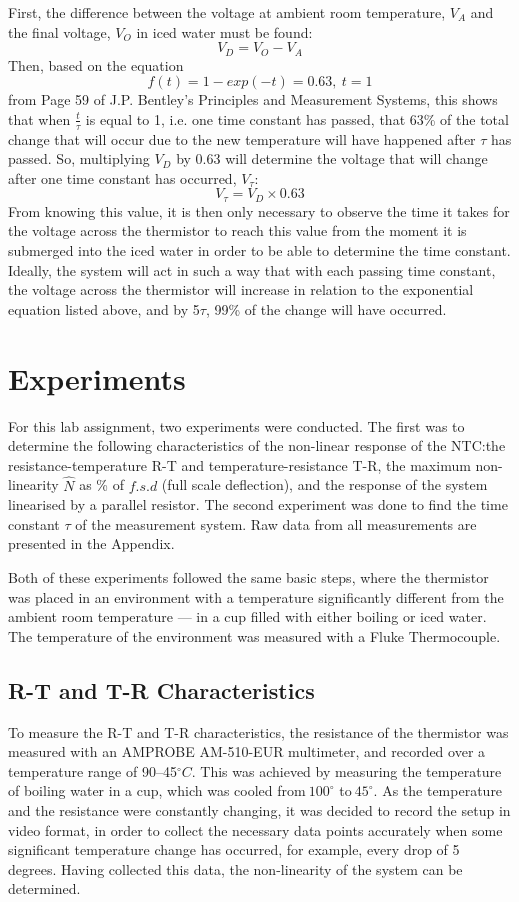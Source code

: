 \documentclass[a4,11pt]{article}
\begin{document}
First, the difference between the voltage at ambient room temperature, $V_A$ and the final voltage, $V_O$ in iced water must be found:
$$V_D=V_O-V_A$$
Then, based on the equation
$$f(t)=1-exp(-t)=0.63,\ t=1$$
from Page 59 of J.P. Bentley's Principles and Measurement Systems, this shows that when $\frac{t}{\tau}$ is equal to 1, i.e. one time constant has passed, that 63\% of the total change that will occur due to the new temperature will have happened after $\tau$ has passed. So, multiplying $V_D$ by 0.63 will determine the voltage that will change after one time constant has occurred, $V_\tau$:
$$V_\tau=V_D\times0.63$$
From knowing this value, it is then only necessary to observe the time it takes for the voltage across the thermistor to reach this value from the moment it is submerged into the iced water in order to be able to determine the time constant. Ideally, the system will act in such a way that with each passing time constant, the voltage across the thermistor will increase in relation to the exponential equation listed above, and by 5$\tau$, 99\% of the change will have occurred.
\section{Experiments}
For this lab assignment, two experiments were conducted. The first was to determine the following characteristics of the non-linear response of the NTC:\@ the resistance-temperature R-T and temperature-resistance T-R, the maximum non-linearity $\hat N$ as \% of $f.s.d$ (full scale deflection), and the response of the system linearised by a parallel resistor. The second experiment was done to find the time constant $\tau$ of the measurement system. Raw data from all measurements are presented in the Appendix.

Both of these experiments followed the same basic steps, where the thermistor was placed in an environment with a temperature significantly different from the ambient room temperature --- in a cup filled with either boiling or iced water. The temperature of the environment was measured with a Fluke Thermocouple.
\subsection{R-T and T-R Characteristics}
To measure the R-T and T-R characteristics, the resistance of the thermistor was measured with an AMPROBE AM-510-EUR multimeter, and recorded over a temperature range of 90--45$^{\circ}C$. This was achieved by measuring the temperature of boiling water in a cup, which was cooled from$~100^{\circ}$ to$~45^{\circ}$. As the temperature and the resistance were constantly changing, it was decided to record the setup in video format, in order to collect the necessary data points accurately when some significant temperature change has occurred, for example, every drop of 5 degrees. Having collected this data, the non-linearity of the system can be determined.
\end{document}
